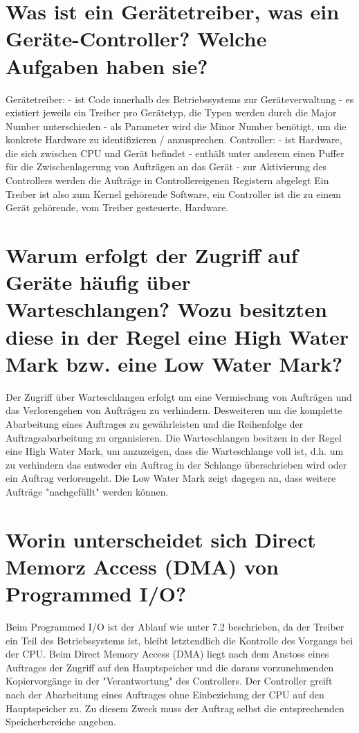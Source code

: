 \documentclass[12pt,a4paper,ngerman]{scrartcl}
\newcommand{\question}[1]{#1}
\newenvironment {answer}
                {}
                {}
\begin{document}
\section{\question{Was ist ein Gerätetreiber, was ein Geräte-Controller? Welche Aufgaben haben sie?}}
\begin{answer}
Gerätetreiber:
- ist Code innerhalb des Betriebssystems zur Geräteverwaltung
- es existiert jeweils ein Treiber pro Gerätetyp, die Typen werden durch die Major Number unterschieden
- als Parameter wird die Minor Number benötigt, um die konkrete Hardware zu identifizieren /
anzusprechen. Controller:
- ist Hardware, die sich zwischen CPU und Gerät befindet
- enthält unter anderem einen Puffer für die Zwischenlagerung von Aufträgen an das Gerät
- zur Aktivierung des Controllers werden die Aufträge in Controllereigenen Registern abgelegt
Ein Treiber ist also zum Kernel gehörende Software, ein Controller ist die zu einem Gerät gehörende,
vom Treiber gesteuerte, Hardware.
\end{answer}

\section{\question{Warum erfolgt der Zugriff auf Geräte häufig über Warteschlangen? Wozu besitzten diese in der Regel eine High Water Mark bzw. eine Low Water Mark?}}
\begin{answer}
Der Zugriff über Warteschlangen erfolgt um eine Vermischung von Aufträgen und das Verlorengehen von Aufträgen zu verhindern. Desweiteren um die komplette Abarbeitung eines Auftrages zu gewährleisten und die Reihenfolge der Auftragsabarbeitung zu organisieren.
Die Warteschlangen besitzen in der Regel eine High Water Mark, um anzuzeigen, dass die Warteschlange voll ist, d.h. um zu verhindern das entweder ein Auftrag in der Schlange überschrieben wird oder ein Auftrag verlorengeht. Die Low Water Mark zeigt dagegen an, dass weitere Aufträge "nachgefüllt" werden können.
\end{answer}

\section{\question{Worin unterscheidet sich Direct Memorz Access (DMA) von Programmed I/O?}}
\begin{answer}
Beim Programmed
I/O ist der Ablauf wie unter 7.2 beschrieben, da der Treiber ein Teil des Betriebssystems ist, bleibt letztendlich die Kontrolle des Vorgangs bei der CPU. Beim Direct Memory Access (DMA) liegt nach dem Anstoss eines Auftrages der Zugriff auf den
Hauptspeicher und die daraus vorzunehmenden Kopiervorgänge in der "Verantwortung" des Controllers.
Der Controller greift nach der Abarbeitung eines Auftrages ohne Einbeziehung der CPU
auf den Hauptspeicher zu. Zu diesem Zweck muss der Auftrag selbst die entsprechenden Speicherbereiche
angeben.
\end{answer}
\end{document}

